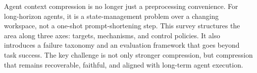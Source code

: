 
Agent context compression is no longer just a preprocessing convenience. For long-horizon agents, it is a state-management problem over a changing workspace, not a one-shot prompt-shortening step. This survey structures the area along three axes: targets, mechanisms, and control policies. It also introduces a failure taxonomy and an evaluation framework that goes beyond task success. The key challenge is not only stronger compression, but compression that remains recoverable, faithful, and aligned with long-term agent execution.